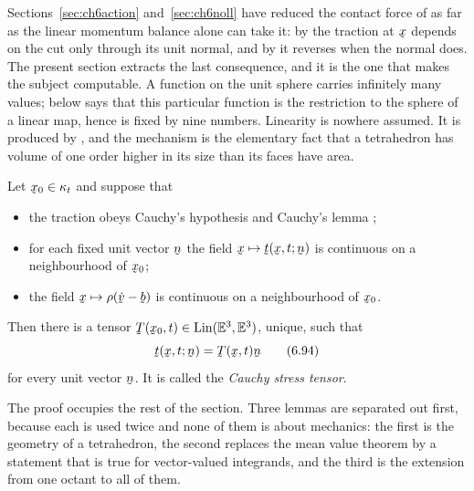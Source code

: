 Sections~\ref{sec:ch6action} and~\ref{sec:ch6noll} have reduced the
contact force of  as far as the linear momentum balance alone
can take it: by  the traction at $\bx$ depends on the cut only
through its unit normal, and by  it reverses when the normal
does. The present section extracts the last consequence, and it is the
one that makes the subject computable. A function on the unit sphere
carries infinitely many values;  below says that this
particular function is the restriction to the sphere of a linear map,
hence is fixed by nine numbers. Linearity is nowhere assumed. It is
produced by , and the mechanism is the elementary fact that a
tetrahedron has volume of one order higher in its size than its faces
have area.

\begin{theorem}\label{thm:ch6cauchy}
Let $\bx_{0}\in\kappa_{t}$ and suppose that
\begin{itemize}\itemsep2pt
\item[\textup{(H1)}] the traction obeys Cauchy's hypothesis 
   and Cauchy's lemma ;
\item[\textup{(H2)}] for each fixed unit vector $\bn$ the field
   $\bx\mapsto\bt(\bx,t;\bn)$ is continuous on a neighbourhood of
   $\bx_{0}$;
\item[\textup{(H3)}] the field $\bx\mapsto\rho(\dot\bv-\bb)$ is
   continuous on a neighbourhood of $\bx_{0}$.
\end{itemize}
Then there is a tensor $\bT(\bx_{0},t)\in\Lin(\Vt,\Vt)$, unique, such
that
\begin{equation}
   \bt(\bx,t;\bn)=\bT(\bx,t)\bn
   \tag{6.94}\label{eq:6.94}
\end{equation}
for every unit vector $\bn$. It is called the \emph{Cauchy stress
tensor}.
\end{theorem}

The proof occupies the rest of the section. Three lemmas are separated
out first, because each is used twice and none of them is about
mechanics: the first is the geometry of a tetrahedron, the second
replaces the mean value theorem by a statement that is true for
vector-valued integrands, and the third is the extension from one octant
to all of them.

